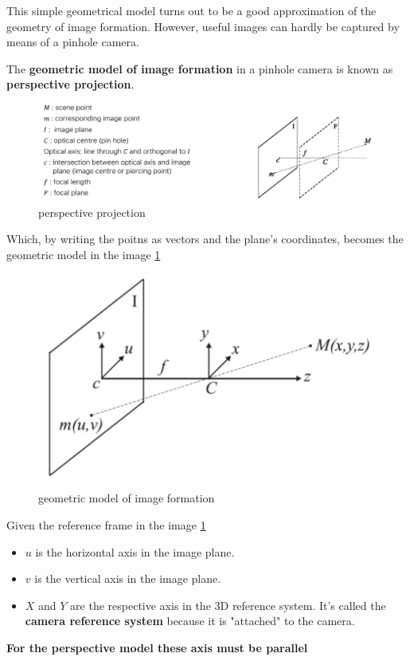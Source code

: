 \documentclass{article}
\begin{document}
This simple geometrical model turns out to be a good approximation of the geometry of image formation.
However, useful images can hardly be captured by means of a pinhole camera.

The \textbf{geometric model of image formation} in a pinhole camera is known as \textbf{perspective projection}.

\begin{figure}[htbp]
  \centering
  \includegraphics[width=0.9\linewidth]{./img/perspective_projection.jpg}
  \caption{perspective projection}
\end{figure}

Which, by writing the poitns as vectors and the plane's coordinates, becomes the geometric model in the image \ref{fig:perspective_projection_axis}

\begin{figure}[htbp]
  \centering
  \includegraphics[width=0.45\linewidth]{./img/perspective_projection_axis.jpg}
  \caption{geometric model of image formation}
  \label{fig:perspective_projection_axis}
\end{figure}

Given the reference frame in the image \ref{fig:perspective_projection_axis} 
\begin{itemize}
  \item $u$ is the horizontal axis in the image plane.
  \item $v$ is the vertical axis in the image plane.
  \item $X$ and $Y$ are the respective axis in the 3D reference system. It's called the \textbf{camera reference system} because it is "attached" to the camera.
\end{itemize}

\textbf{For the perspective model these axis must be parallel}
\end{document}

